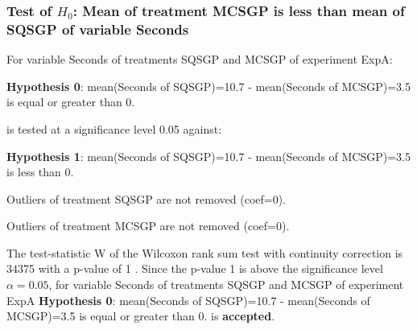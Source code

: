 \begin{frame}[t]
 \frametitle{Test of $H_{0}$: Mean of treatment MCSGP is less than mean of SQSGP of variable Seconds }
 \scriptsize
 For variable Seconds of treatments SQSGP and MCSGP of experiment ExpA:

\vspace{1mm}
{\bf Hypothesis 0}: mean(Seconds of SQSGP)=10.7 - mean(Seconds of MCSGP)=3.5 is equal or greater than 0.


 \begin{center} is tested at a significance level 0.05 against: \end{center}

{\bf Hypothesis 1}: mean(Seconds of SQSGP)=10.7 - mean(Seconds of MCSGP)=3.5 is less than 0.
\vspace{1mm}
\vspace{1mm}

 Outliers of treatment SQSGP  are not removed (coef=0).

 Outliers of treatment MCSGP  are not removed (coef=0).
\vspace{1mm}
 
 The test-statistic W of the Wilcoxon rank sum test with continuity correction is 34375 with a p-value of 1 .
 Since the p-value 1 is above the significance level $\alpha= 0.05 $,
 for variable Seconds of treatments SQSGP and MCSGP of experiment ExpA 
 {\bf Hypothesis 0}: mean(Seconds of SQSGP)=10.7 - mean(Seconds of MCSGP)=3.5 is equal or greater than 0.
is {\bf accepted}.

 \end{frame}
